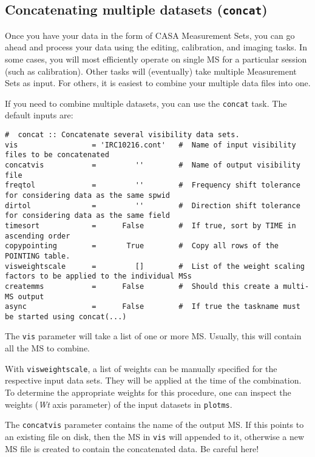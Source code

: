 \subsection{Concatenating multiple datasets ({\tt concat})}
\label{section:io.concat}

Once you have your data in the form of CASA Measurement Sets, you
can go ahead and process your data using the editing, calibration,
and imaging tasks.  In some cases, you will most efficiently operate
on single MS for a particular session (such as calibration).  Other
tasks will (eventually) take multiple Measurement Sets as input.  For others,
it is easiest to combine your multiple data files into one.

If you need to combine multiple datasets, you can use the {\tt concat} task.
The default inputs are:
\small
\begin{verbatim}
#  concat :: Concatenate several visibility data sets.
vis                 = 'IRC10216.cont'   #  Name of input visibility files to be concatenated
concatvis           =         ''        #  Name of output visibility file
freqtol             =         ''        #  Frequency shift tolerance for considering data as the same spwid
dirtol              =         ''        #  Direction shift tolerance for considering data as the same field
timesort            =      False        #  If true, sort by TIME in ascending order
copypointing        =       True        #  Copy all rows of the POINTING table.
visweightscale      =         []        #  List of the weight scaling factors to be applied to the individual MSs
createmms           =      False        #  Should this create a multi-MS output
async               =      False        #  If true the taskname must
be started using concat(...)

\end{verbatim}
\normalsize

The {\tt vis} parameter will take a list of one or more MS.  Usually,
this will contain all the MS to combine.

With {\tt visweightscale}, a list of weights can be manually specified
for the respective input data sets. They will be applied at the time
of the combination. To determine the appropriate weights for this
procedure, one can inspect the weights ({\it Wt} axis parameter) of
the input datasets in {\tt plotms}.

The {\tt concatvis} parameter contains the name of the output MS.
If this points to an existing file on disk, then the MS in
{\tt vis} will appended to it,  otherwise a new MS file
is created to contain the concatenated data.  Be careful here!

